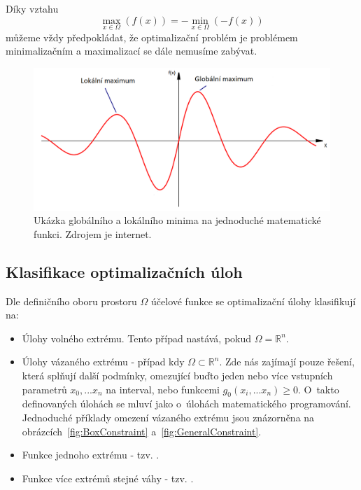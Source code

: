 Díky vztahu 
\begin{equation}
\max\limits_{x \in \Omega}(f (x)) = -\min\limits_{x \in \Omega}(-f(x))
\label{eq:max_min}
\end{equation} 
můžeme vždy předpokládat, že optimalizační problém je problémem minimalizačním a maximalizací se dále nemusíme zabývat. 

\begin{figure}
\centering
\includegraphics[width=\linewidth * 3/4]{obrazky-figures/localGlobal.png}
\caption{Ukázka globálního a lokálního minima na jednoduché matematické funkci. Zdrojem je internet.}
\label{fig:localGlobal}
\end{figure}


\subsection{Klasifikace optimalizačních úloh} \label{subsec:classific}
Dle definičního oboru prostoru \(\Omega\) účelové funkce se optimalizační úlohy klasifikují na:

\begin{itemize}
\item Úlohy volného extrému. Tento případ nastává, pokud \(\Omega = \mathbb{R}^n\).
\item Úlohy vázaného extrému - případ kdy \(\Omega \subset \mathbb{R}^n\). Zde nás zajímají pouze řešení, která splňují další podmínky, omezující buďto jeden nebo více vstupních parametrů \(x_0, ... x_n\) na interval, nebo funkcemi \(g_0(x_i, ... x_n) \geq 0 \). O~takto definovaných úlohách se mluví jako o~úlohách matematického programování. Jednoduché příklady omezení vázaného extrému jsou znázorněna na obrázcích~\ref{fig:BoxConstraint} a~\ref{fig:GeneralConstraint}.
\item Funkce jednoho extrému - tzv. .
\item Funkce více extrémů stejné váhy - tzv. .
\end{itemize}

